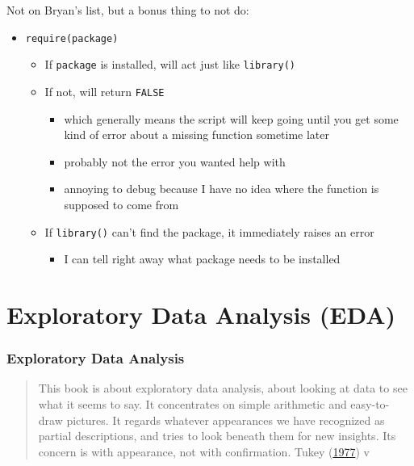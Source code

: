\documentclass[
]{article}
\providecommand{\tightlist}{%
  \setlength{\itemsep}{0pt}\setlength{\parskip}{0pt}}
\begin{document}
Not on Bryan's list, but a bonus thing to not do:

\begin{itemize}
\tightlist
\item
  \texttt{require(package)}

  \begin{itemize}
  \tightlist
  \item
    If \texttt{package} is installed, will act just like \texttt{library()}
  \item
    If not, will return \texttt{FALSE}

    \begin{itemize}
    \tightlist
    \item
      which generally means the script will keep going until you get some kind of error about a missing function sometime later
    \item
      probably not the error you wanted help with
    \item
      annoying to debug because I have no idea where the function is supposed to come from
    \end{itemize}
  \item
    If \texttt{library()} can't find the package, it immediately raises an error

    \begin{itemize}
    \tightlist
    \item
      I can tell right away what package needs to be installed
    \end{itemize}
  \end{itemize}
\end{itemize}

\hypertarget{part-exploratory-data-analysis-eda}{%
\part{Exploratory Data Analysis (EDA)}\label{part-exploratory-data-analysis-eda}}

\hypertarget{eda-models}{%
\section{Exploratory Data Analysis}\label{eda-models}}

\begin{quote}
This book is about exploratory data analysis, about looking at data to see what it seems to say. It concentrates on simple arithmetic and easy-to-draw pictures. It regards whatever appearances we have recognized as partial descriptions, and tries to look beneath them for new insights. Its concern is with appearance, not with confirmation. Tukey (\protect\hyperlink{ref-TukeyExploratoryDataAnalysis1977}{1977}) v
\end{quote}
\end{document}
